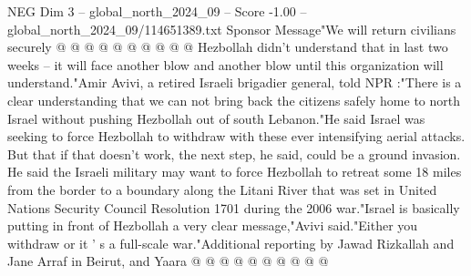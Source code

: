 \begin{textsample}{NEG Dim 3 – global\_north\_2024\_09 – Score -1.00 – global\_north\_2024\_09/114651389.txt}
Sponsor Message"We will return civilians securely @ @ @ @ @ @ @ @ @ @ Hezbollah didn't understand that in last two weeks -- it will face another blow and another blow until this organization will understand."Amir Avivi, a retired Israeli brigadier general, told NPR :"There is a clear understanding that we can not bring back the citizens safely home to north Israel without pushing Hezbollah out of south Lebanon."He said Israel was seeking to force Hezbollah to withdraw with these ever intensifying aerial attacks.
But that if that doesn't work, the next step, he said, could be a ground invasion.
He said the Israeli military may want to force Hezbollah to retreat some 18 miles from the border to a boundary along the Litani River that was set in United Nations Security Council Resolution 1701 during the 2006 war."Israel is basically putting in front of Hezbollah a very clear message,"Avivi said."Either you withdraw or it ' s a full-scale war."Additional reporting by Jawad Rizkallah and Jane Arraf in Beirut, and Yaara @ @ @ @ @ @ @ @ @ @

\end{textsample}
